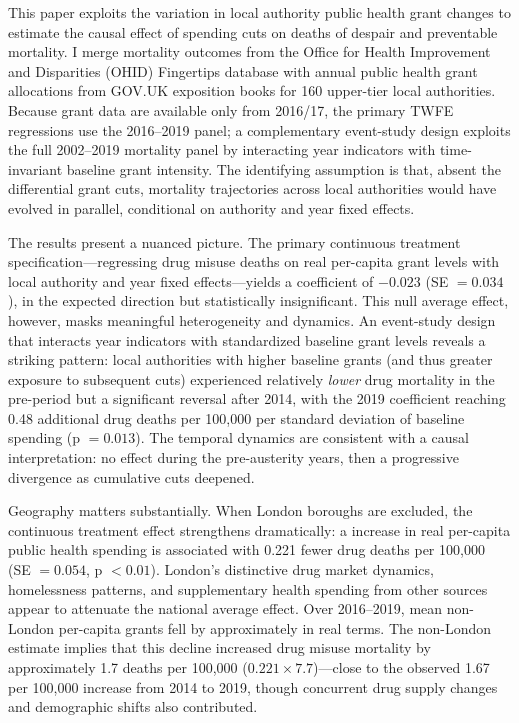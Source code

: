 \documentclass[12pt]{article}
\begin{document}
This paper exploits the variation in local authority public health grant changes to estimate the causal effect of spending cuts on deaths of despair and preventable mortality. I merge mortality outcomes from the Office for Health Improvement and Disparities (OHID) Fingertips database with annual public health grant allocations from GOV.UK exposition books for 160 upper-tier local authorities. Because grant data are available only from 2016/17, the primary TWFE regressions use the 2016--2019 panel; a complementary event-study design exploits the full 2002--2019 mortality panel by interacting year indicators with time-invariant baseline grant intensity. The identifying assumption is that, absent the differential grant cuts, mortality trajectories across local authorities would have evolved in parallel, conditional on authority and year fixed effects.

The results present a nuanced picture. The primary continuous treatment specification---regressing drug misuse deaths on real per-capita grant levels with local authority and year fixed effects---yields a coefficient of $-0.023$ (SE $= 0.034$), in the expected direction but statistically insignificant. This null average effect, however, masks meaningful heterogeneity and dynamics. An event-study design that interacts year indicators with standardized baseline grant levels reveals a striking pattern: local authorities with higher baseline grants (and thus greater exposure to subsequent cuts) experienced relatively \textit{lower} drug mortality in the pre-period but a significant reversal after 2014, with the 2019 coefficient reaching 0.48 additional drug deaths per 100,000 per standard deviation of baseline spending (p $= 0.013$). The temporal dynamics are consistent with a causal interpretation: no effect during the pre-austerity years, then a progressive divergence as cumulative cuts deepened.

Geography matters substantially. When London boroughs are excluded, the continuous treatment effect strengthens dramatically: a  increase in real per-capita public health spending is associated with 0.221 fewer drug deaths per 100,000 (SE $= 0.054$, p $< 0.01$). London's distinctive drug market dynamics, homelessness patterns, and supplementary health spending from other sources appear to attenuate the national average effect. Over 2016--2019, mean non-London per-capita grants fell by approximately  in real terms. The non-London estimate implies that this decline increased drug misuse mortality by approximately 1.7 deaths per 100,000 ($0.221 \times 7.7$)---close to the observed 1.67 per 100,000 increase from 2014 to 2019, though concurrent drug supply changes and demographic shifts also contributed.
\end{document}
